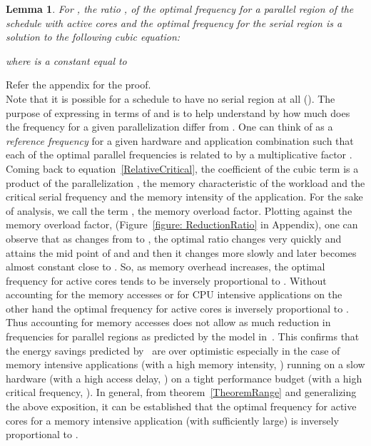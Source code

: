 \documentclass[11pt, letterpaper]{article}
\newtheorem{lemma}{Lemma}
\begin{document}
\begin{lemma}\label{CubicEquation}
 For , the ratio , of the optimal frequency  for a parallel region of the schedule with  active cores and the optimal frequency  for the serial region is a solution to the following cubic equation:
 
 where  is a constant equal to 
\end{lemma}
Refer the appendix for the proof.\\
Note that it is possible for a schedule to have no serial region at all (). The purpose of expressing  in terms of  and  is to help understand by how much does the frequency for a given parallelization differ from . One can think of  as a \emph{reference frequency} for a given hardware and application combination such that each of the optimal parallel frequencies  is related to  by a multiplicative factor .
Coming back to equation~\ref{RelativeCritical}, the coefficient of the cubic term is a product of the parallelization , the memory characteristic  of the workload and the critical serial frequency  and the memory intensity of the application. For the sake of analysis, we call the term , the memory overload factor. 
Plotting  against the memory overload factor, (Figure~\ref{figure: ReductionRatio} in Appendix), one can observe that as   changes from  to , the optimal ratio changes very quickly and attains the mid point of  and  and then it changes more slowly and later becomes almost constant close to . So, as memory overhead increases, the optimal frequency for  active cores tends to be inversely proportional to . Without accounting for the memory accesses or for CPU intensive applications on the other hand the optimal frequency for  active cores is inversely proportional to . Thus accounting for memory accesses does not allow as much reduction in frequencies for parallel regions as predicted by the model in~\cite{ConvexAndScheduling}. 
This confirms that the energy savings predicted by~\cite{ConvexAndScheduling} are over optimistic especially in the case of memory intensive applications (with a high memory intensity, ) running on a slow hardware (with a high access 
delay, ) on a tight performance budget (with a high critical frequency, ).
In general, from theorem~\ref{TheoremRange} and generalizing the above exposition, it can be established that the optimal frequency for  active cores for a memory intensive application (with  sufficiently large) is inversely proportional to .
\end{document}
